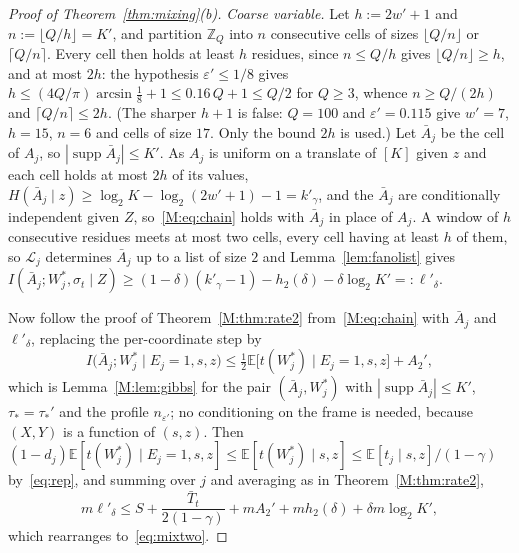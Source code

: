 \documentclass[aps,prx,twocolumn,superscriptaddress,nofootinbib,longbibliography]{revtex4-2}
\theoremstyle{plain}
\theoremstyle{definition}
\theoremstyle{remark}
\newcommand{\E}{\mathbb{E}}
\newcommand{\Z}{\mathbb{Z}}
\newcommand{\supp}{\operatorname{supp}}
\begin{document}
\begin{proof}[Proof of Theorem~\ref{thm:mixing}(b)]
\emph{Coarse variable.} Let $h:=2w'+1$ and $n:=\lfloor Q/h\rfloor=K'$, and partition $\Z_Q$ into $n$ consecutive cells of sizes $\lfloor Q/n\rfloor$ or $\lceil Q/n\rceil$. Every cell then holds at least $h$ residues, since $n\le Q/h$ gives $\lfloor Q/n\rfloor\ge h$, and at most $2h$: the hypothesis $\varepsilon'\le1/8$ gives $h\le(4Q/\pi)\arcsin\tfrac18+1\le0.16\,Q+1\le Q/2$ for $Q\ge3$, whence $n\ge Q/(2h)$ and $\lceil Q/n\rceil\le2h$. (The sharper $h+1$ is false: $Q=100$ and $\varepsilon'=0.115$ give $w'=7$, $h=15$, $n=6$ and cells of size $17$. Only the bound $2h$ is used.) Let $\bar A_j$ be the cell of $A_j$, so $|\supp\bar A_j|\le K'$. As $A_j$ is uniform on a translate of $[K]$ given $z$ and each cell holds at most $2h$ of its values, $H(\bar A_j\mid z)\ge\log_2K-\log_2(2w'+1)-1=k'_\gamma$, and the $\bar A_j$ are conditionally independent given $Z$, so~\eqref{M:eq:chain} holds with $\bar A_j$ in place of $A_j$. A window of $h$ consecutive residues meets at most two cells, every cell having at least $h$ of them, so $\mathcal L_j$ determines $\bar A_j$ up to a list of size $2$ and Lemma~\ref{lem:fanolist} gives $I(\bar A_j;W^*_j,\sigma_t\mid Z)\ge(1-\delta)(k'_\gamma-1)-h_2(\delta)-\delta\log_2K'=:\ell'_\delta$.

Now follow the proof of Theorem~\ref{M:thm:rate2} from~\eqref{M:eq:chain} with $\bar A_j$ and $\ell'_\delta$, replacing the per-coordinate step by
\[
I\big(\bar A_j;W^*_j\mid E_j=1,s,z\big)\le\tfrac12\E\big[t(W^*_j)\mid E_j=1,s,z\big]+A_2',
\]
which is Lemma~\ref{M:lem:gibbs} for the pair $(\bar A_j,W^*_j)$ with $|\supp\bar A_j|\le K'$, $\tau_*=\tau_*'$ and the profile $n_{\varepsilon'}$; no conditioning on the frame is needed, because $(X,Y)$ is a function of $(s,z)$. Then $(1-d_j)\E[t(W^*_j)\mid E_j=1,s,z]\le\E[t(W^*_j)\mid s,z]\le\E[t_j\mid s,z]/(1-\gamma)$ by~\eqref{eq:rep}, and summing over $j$ and averaging as in Theorem~\ref{M:thm:rate2},
\[
m\ell'_\delta\le S+\frac{\bar T_t}{2(1-\gamma)}+mA_2'+mh_2(\delta)+\delta m\log_2K',
\]
which rearranges to~\eqref{eq:mixtwo}.
\end{proof}
\end{document}
